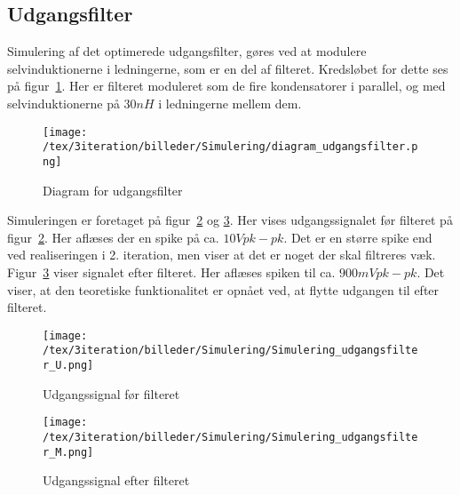 
\subsection{Udgangsfilter}
Simulering af det optimerede udgangsfilter, gøres ved at modulere selvinduktionerne i ledningerne, som er en del af filteret. Kredsløbet for dette ses på figur~\ref{fig:diagram_udgangsfilter_3}. Her er filteret moduleret som de fire kondensatorer i parallel, og med selvinduktionerne på $30nH$ i ledningerne mellem dem. 

\begin{figure}[H]
	\center
	\texttt{[image: /tex/3iteration/billeder/Simulering/diagram\_udgangsfilter.png]}
	\caption{Diagram for udgangsfilter}
	\label{fig:diagram_udgangsfilter_3}
\end{figure}

\noindent Simuleringen er foretaget på figur~\ref{fig:simulering_udgangsfilter_U} og \ref{fig:simulering_udgangsfilter_M}. Her vises udgangssignalet før filteret på figur~\ref{fig:simulering_udgangsfilter_U}. Her aflæses der en spike på ca. $10V pk-pk$. Det er en større spike end ved realiseringen i 2. iteration, men viser at det er noget der skal filtreres væk. Figur~\ref{fig:simulering_udgangsfilter_M} viser signalet efter filteret. Her aflæses spiken til ca. $900mV pk-pk$. Det viser, at den teoretiske funktionalitet er opnået ved, at flytte udgangen til efter filteret. 

\begin{figure}[H]
	\center
	\texttt{[image: /tex/3iteration/billeder/Simulering/Simulering\_udgangsfilter\_U.png]}
	\caption{Udgangssignal før filteret}
	\label{fig:simulering_udgangsfilter_U}
\end{figure}

\begin{figure}[H]
	\center
	\texttt{[image: /tex/3iteration/billeder/Simulering/Simulering\_udgangsfilter\_M.png]}
	\caption{Udgangssignal efter filteret}
	\label{fig:simulering_udgangsfilter_M}
\end{figure}
